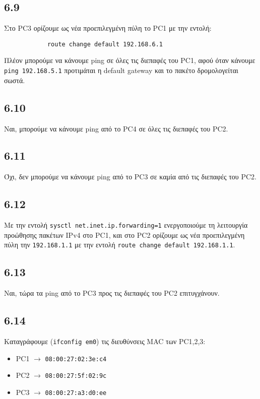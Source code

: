 \documentclass[a4paper, 12pt]{article}
\begin{document}
	\subsection*{6.9} 
		Στο PC3 ορίζουμε ως νέα προεπιλεγμένη πύλη το PC1 με την εντολή:
		
		\begin{verbatim}
			route change default 192.168.6.1
		\end{verbatim}
		
		Πλέον μπορούμε να κάνουμε ping σε όλες τις διεπαφές του PC1, αφού όταν κάνουμε \verb|ping 192.168.5.1| προτιμάται η default gateway και το πακέτο δρομολογείται σωστά.

	\subsection*{6.10}
		Ναι, μπορούμε να κάνουμε ping από το PC4 σε όλες τις διεπαφές του PC2.

	\subsection*{6.11}
		Όχι, δεν μπορούμε να κάνουμε ping από το PC3 σε καμία από τις διεπαφές του PC2.

	\subsection*{6.12}
		Με την εντολή \verb|sysctl net.inet.ip.forwarding=1| ενεργοποιούμε τη λειτουργία προώθησης πακέτων IPv4 στο PC1, και στο PC2 ορίζουμε ως νέα προεπιλεγμένη πύλη την \verb|192.168.1.1| με την εντολή \verb|route change default 192.168.1.1|.

	\subsection*{6.13}
		Ναι, τώρα τα ping από το PC3 προς τις διεπαφές του PC2 επιτυγχάνουν.

	\subsection*{6.14}
		Καταγράφουμε (\verb|ifconfig em0|) τις διευθύνσεις MAC των PC1,2,3:
		
		\begin{itemize}
			\item PC1 $\rightarrow$ \verb|08:00:27:02:3e:c4|
			\item PC2 $\rightarrow$ \verb|08:00:27:5f:02:9c|
			\item PC3 $\rightarrow$ \verb|08:00:27:a3:d0:ee|
		\end{itemize}
		
\end{document}
